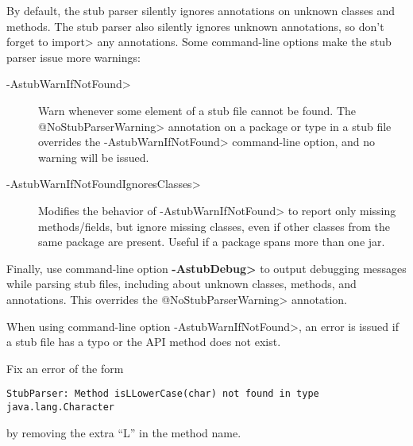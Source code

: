 


By default, the stub parser silently ignores
annotations on unknown classes and methods.
The stub parser also silently ignores unknown annotations, so don't forget to
\<import> any annotations.
Some command-line options make the stub parser issue more warnings:

\begin{description}
\item[\<-AstubWarnIfNotFound>]
  Warn whenever some element of a stub file cannot be found.
  The \<@NoStubParserWarning> annotation on a package or type in a stub file
  overrides the \<-AstubWarnIfNotFound> command-line option, and no warning
  will be issued.

\item[\<-AstubWarnIfNotFoundIgnoresClasses>]
  Modifies the behavior of \<-AstubWarnIfNotFound>
  to report only missing methods/fields, but ignore missing classes, even if
  other classes from the same package are present.
  Useful if a package spans more than one jar.

\end{description}

Finally,
use command-line option {\bf\<-AstubDebug>} to output debugging messages while
parsing stub files, including about unknown classes, methods, and
annotations.  This overrides the \<@NoStubParserWarning> annotation.




When using command-line option \<-AstubWarnIfNotFound>,
an error is issued if a stub file has a typo or the API method does not
exist.

Fix an error of the form
\begin{Verbatim}
StubParser: Method isLLowerCase(char) not found in type java.lang.Character
\end{Verbatim}

\noindent
by removing the extra ``L'' in the method name.

